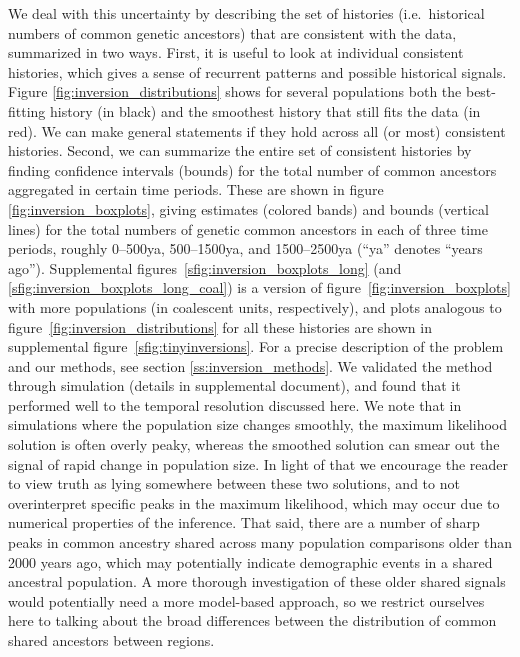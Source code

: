 \documentclass{article}
\begin{document}
We deal with this uncertainty by describing the set of histories 
(i.e.\ historical numbers of common genetic ancestors)
that are consistent with the data,
summarized in two ways.
First, it is useful to look at individual consistent histories,
which gives a sense of recurrent patterns and possible historical signals.
Figure \ref{fig:inversion_distributions} shows for several populations both
the best-fitting history (in black) 
and the smoothest history that still fits the data (in red).
We can make general statements if they hold across all (or most) consistent histories.
Second, we can summarize the entire set of consistent histories 
by finding confidence intervals (bounds)  
for the total number of common ancestors aggregated in certain time periods.
These are shown in figure \ref{fig:inversion_boxplots},
giving estimates (colored bands) and bounds (vertical lines) 
for the total numbers of genetic common ancestors in each of three time periods,
roughly 0--500ya, 500--1500ya, and 1500--2500ya (``ya'' denotes ``years ago'').
Supplemental figures~\ref{sfig:inversion_boxplots_long} (and \ref{sfig:inversion_boxplots_long_coal})
is a version of figure~\ref{fig:inversion_boxplots} with more populations (in coalescent units, respectively),
and plots analogous to figure~\ref{fig:inversion_distributions} for all these histories
are shown in supplemental figure~\ref{sfig:tinyinversions}.
For a precise description of the problem and our methods, see section \ref{ss:inversion_methods}.
We validated the method through simulation (details in supplemental document), 
and found that it performed well to the temporal resolution discussed here. 
We note that in simulations where the population size changes smoothly, 
the maximum likelihood solution is often overly peaky, 
whereas the smoothed solution can smear out the signal of rapid change in population size. 
In light of that we encourage the reader to view truth as lying somewhere between these two solutions, 
and to not overinterpret specific peaks in the maximum likelihood,
which may occur due to numerical properties of the inference. 
That said, there are a number of sharp peaks in common ancestry shared across many population comparisons older than 2000 years ago, 
which may potentially indicate demographic events in a shared ancestral population. 
A more thorough investigation of these older shared signals would potentially need a more model-based approach, 
so we restrict ourselves here to talking about the broad differences between the distribution of common shared ancestors between regions.
\end{document}
